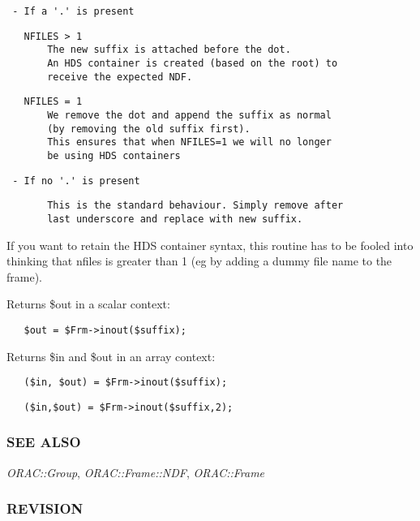 \begin{description}
\begin{verbatim}
 - If a '.' is present
\end{verbatim}
\begin{verbatim}
   NFILES > 1
       The new suffix is attached before the dot.
       An HDS container is created (based on the root) to
       receive the expected NDF.
\end{verbatim}
\begin{verbatim}
   NFILES = 1
       We remove the dot and append the suffix as normal
       (by removing the old suffix first).
       This ensures that when NFILES=1 we will no longer
       be using HDS containers
\end{verbatim}
\begin{verbatim}
 - If no '.' is present
\end{verbatim}
\begin{verbatim}
       This is the standard behaviour. Simply remove after
       last underscore and replace with new suffix.
\end{verbatim}


If you want to retain the HDS container syntax, this routine has to be
fooled into thinking that nfiles is greater than 1 (eg by adding a dummy
file name to the frame).



Returns \$out in a scalar context:

\begin{verbatim}
   $out = $Frm->inout($suffix);
\end{verbatim}


Returns \$in and \$out in an array context:

\begin{verbatim}
   ($in, $out) = $Frm->inout($suffix);
\end{verbatim}
\begin{verbatim}
   ($in,$out) = $Frm->inout($suffix,2);
\end{verbatim}
\end{description}
\subsubsection*{SEE ALSO\label{ORAC::Frame::UKIRT_SEE_ALSO}}


\emph{ORAC::Group}, \emph{ORAC::Frame::NDF}, \emph{ORAC::Frame}

\subsubsection*{REVISION\label{ORAC::Frame::UKIRT_REVISION}}


